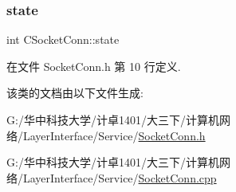 \subsubsection{\texorpdfstring{state}{state}}
{\footnotesize\ttfamily int C\+Socket\+Conn\+::state}



在文件 Socket\+Conn.\+h 第 10 行定义.



该类的文档由以下文件生成\+:\begin{DoxyCompactItemize}
\item 
G\+:/华中科技大学/计卓1401/大三下/计算机网络/\+Layer\+Interface/\+Service/\hyperlink{_socket_conn_8h}{Socket\+Conn.\+h}\item 
G\+:/华中科技大学/计卓1401/大三下/计算机网络/\+Layer\+Interface/\+Service/\hyperlink{_socket_conn_8cpp}{Socket\+Conn.\+cpp}\end{DoxyCompactItemize}
